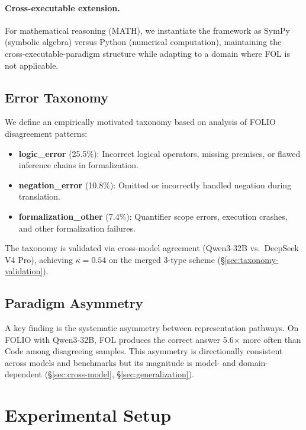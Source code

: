 \documentclass[11pt,a4paper]{article}
\begin{document}
\paragraph{Cross-executable extension.}
For mathematical reasoning (MATH), we instantiate the framework as SymPy (symbolic algebra) versus Python (numerical computation), maintaining the cross-executable-paradigm structure while adapting to a domain where FOL is not applicable.

\subsection{Error Taxonomy}

We define an empirically motivated taxonomy based on analysis of FOLIO disagreement patterns:

\begin{itemize}
\item \textbf{logic\_error} (25.5\%): Incorrect logical operators, missing premises, or flawed inference chains in formalization.
\item \textbf{negation\_error} (10.8\%): Omitted or incorrectly handled negation during translation.
\item \textbf{formalization\_other} (7.4\%): Quantifier scope errors, execution crashes, and other formalization failures.
\end{itemize}

The taxonomy is validated via cross-model agreement (Qwen3-32B vs.\ DeepSeek V4 Pro), achieving $\kappa{=}0.54$ on the merged 3-type scheme (\S\ref{sec:taxonomy-validation}).

\subsection{Paradigm Asymmetry}

A key finding is the systematic asymmetry between representation pathways.
On FOLIO with Qwen3-32B, FOL produces the correct answer 5.6$\times$ more often than Code among disagreeing samples.
This asymmetry is directionally consistent across models and benchmarks but its magnitude is model- and domain-dependent (\S\ref{sec:cross-model}, \S\ref{sec:generalization}).

\section{Experimental Setup}
\end{document}

